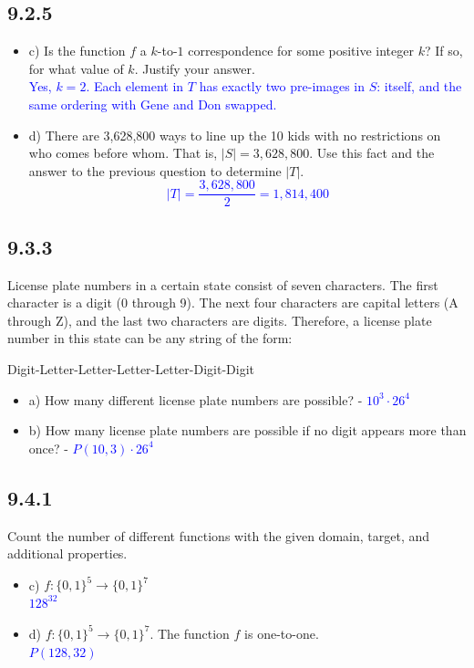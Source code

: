 \documentclass{article}
\begin{document}
\subsection*{9.2.5}
\begin{itemize}
    \item c) Is the function $f$ a $k$-to-$1$ correspondence for some positive integer $k$? If so, for what value of $k$. Justify your answer.\\
    \textcolor{blue}{Yes, $k = 2$. Each element in $T$ has exactly two pre-images in $S$: itself, and the same ordering with Gene and Don swapped.}
    \item d) There are 3,628,800 ways to line up the 10 kids with no restrictions on who comes before whom. That is, $|S| = 3,628,800$. Use this fact and the answer to the previous question to determine $|T|$.\\
    \textcolor{blue}{\[ |T| = \frac{3,628,800}{2} = 1,814,400 \]}
\end{itemize}

\subsection*{9.3.3} License plate numbers in a certain state consist of seven characters. The first character is a digit (0 through 9). The next four characters are capital letters (A through Z), and the last two characters are digits. Therefore, a license plate number in this state can be any string of the form:

Digit-Letter-Letter-Letter-Letter-Digit-Digit
\begin{itemize}
    \item a) How many different license plate numbers are possible? - 
    \textcolor{blue}{$10^3 \cdot 26^4$}
    \item b) How many license plate numbers are possible if no digit appears more than once? - 
    \textcolor{blue}{$P(10,3) \cdot 26^4$}
\end{itemize}

\subsection*{9.4.1}
Count the number of different functions with the given domain, target, and additional properties.
\begin{itemize}
    \item c) $f : \{0, 1\}^5 \rightarrow \{0, 1\}^7$ \\
    \textcolor{blue}{$128^{32}$}
    \item d) $f : \{0, 1\}^5 \rightarrow \{0, 1\}^7$. The function $f$ is one-to-one.\\
    \textcolor{blue}{$P(128, 32)$}
\end{itemize}
\end{document}
